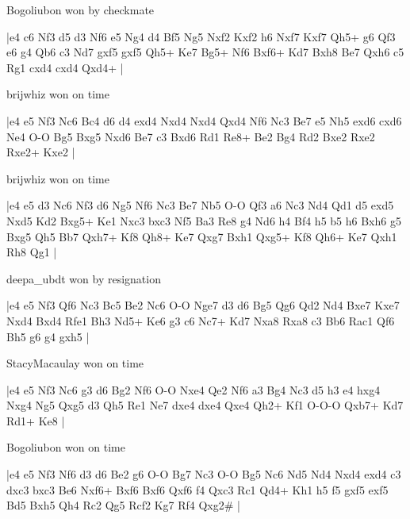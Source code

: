 \showboard

Bogoliubon won by checkmate

\makegametitle
|e4 c6 Nf3 d5 d3 Nf6 e5 Ng4 d4 Bf5 Ng5 Nxf2 Kxf2 h6 Nxf7 Kxf7 Qh5+ g6 Qf3 e6 g4 Qb6 c3 Nd7 gxf5 gxf5 Qh5+ Ke7 Bg5+ Nf6 Bxf6+ Kd7 Bxh8 Be7 Qxh6 c5 Rg1 cxd4 cxd4 Qxd4+  |

\showboard

brijwhiz won on time

\makegametitle
|e4 e5 Nf3 Nc6 Bc4 d6 d4 exd4 Nxd4 Nxd4 Qxd4 Nf6 Nc3 Be7 e5 Nh5 exd6 cxd6 Ne4 O-O Bg5 Bxg5 Nxd6 Be7 c3 Bxd6 Rd1 Re8+ Be2 Bg4 Rd2 Bxe2 Rxe2 Rxe2+ Kxe2  |

\showboard

brijwhiz won on time

\makegametitle
|e4 e5 d3 Nc6 Nf3 d6 Ng5 Nf6 Nc3 Be7 Nb5 O-O Qf3 a6 Nc3 Nd4 Qd1 d5 exd5 Nxd5 Kd2 Bxg5+ Ke1 Nxc3 bxc3 Nf5 Ba3 Re8 g4 Nd6 h4 Bf4 h5 b5 h6 Bxh6 g5 Bxg5 Qh5 Bb7 Qxh7+ Kf8 Qh8+ Ke7 Qxg7 Bxh1 Qxg5+ Kf8 Qh6+ Ke7 Qxh1 Rh8 Qg1  |

\showboard

deepa\_ubdt won by resignation

\makegametitle
|e4 e5 Nf3 Qf6 Nc3 Bc5 Be2 Nc6 O-O Nge7 d3 d6 Bg5 Qg6 Qd2 Nd4 Bxe7 Kxe7 Nxd4 Bxd4 Rfe1 Bh3 Nd5+ Ke6 g3 c6 Nc7+ Kd7 Nxa8 Rxa8 c3 Bb6 Rac1 Qf6 Bh5 g6 g4 gxh5  |

\showboard

StacyMacaulay won on time

\makegametitle
|e4 e5 Nf3 Nc6 g3 d6 Bg2 Nf6 O-O Nxe4 Qe2 Nf6 a3 Bg4 Nc3 d5 h3 e4 hxg4 Nxg4 Ng5 Qxg5 d3 Qh5 Re1 Ne7 dxe4 dxe4 Qxe4 Qh2+ Kf1 O-O-O Qxb7+ Kd7 Rd1+ Ke8  |

\showboard

Bogoliubon won on time

\makegametitle
|e4 e5 Nf3 Nf6 d3 d6 Be2 g6 O-O Bg7 Nc3 O-O Bg5 Nc6 Nd5 Nd4 Nxd4 exd4 c3 dxc3 bxc3 Be6 Nxf6+ Bxf6 Bxf6 Qxf6 f4 Qxc3 Rc1 Qd4+ Kh1 h5 f5 gxf5 exf5 Bd5 Bxh5 Qh4 Rc2 Qg5 Rcf2 Kg7 Rf4 Qxg2\#  |

